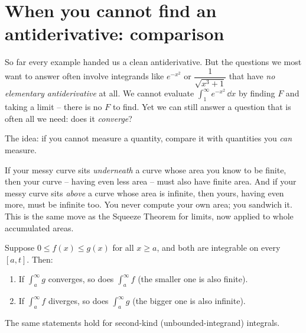 \section{When you cannot find an antiderivative: comparison}
\label{ch25:comparison}

So far every example handed us a clean antiderivative. But the questions we most
want to answer often involve integrands like $e^{-x^2}$ or
$\dfrac{1}{\sqrt{x^3+1}}$ that have \emph{no elementary antiderivative} at all. We
cannot evaluate $\int_1^\infty e^{-x^2}\,\dd x$ by finding $F$ and taking a limit --
there is no $F$ to find. Yet we can still answer a question that is often all we
need: does it \emph{converge}?

The idea: if you cannot measure a quantity, compare it with quantities you
\emph{can} measure.

\begin{intuitionbox}
If your messy curve sits \emph{underneath} a curve whose area you know to be
finite, then your curve -- having even less area -- must also have finite area. And
if your messy curve sits \emph{above} a curve whose area is infinite, then yours,
having even more, must be infinite too. You never compute your own area; you
sandwich it. This is the same move as the Squeeze Theorem for limits, now applied
to whole accumulated areas.
\end{intuitionbox}

\begin{theorem}
\label{ch25:thm-comparison}
Suppose $0 \le f(x) \le g(x)$ for all $x \ge a$, and both are integrable on every
$[a,t]$. Then:
\begin{enumerate}
  \item If $\displaystyle\int_a^{\infty} g$ converges, so does
  $\displaystyle\int_a^{\infty} f$ (the smaller one is also finite).
  \item If $\displaystyle\int_a^{\infty} f$ diverges, so does
  $\displaystyle\int_a^{\infty} g$ (the bigger one is also infinite).
\end{enumerate}
The same statements hold for second-kind (unbounded-integrand) integrals.
\end{theorem}

